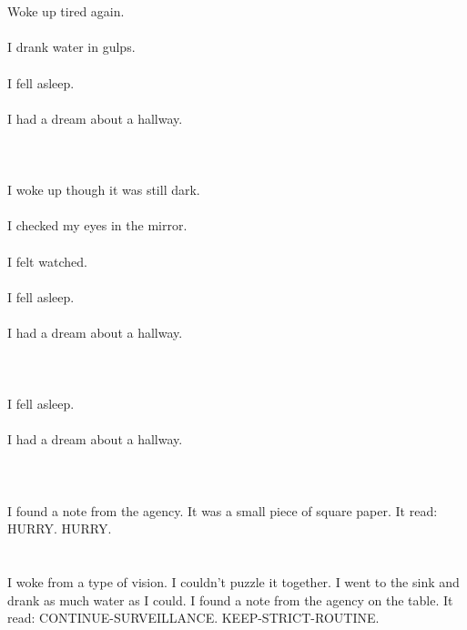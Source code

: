 \documentclass{article}
\begin{document}
    \section{}
    Woke up tired again.\\\\I drank water in gulps.\\\\I fell asleep.\\\\I had a dream about a hallway.\\\\ 
    \newpage
    
    \section{}
    I woke up though it was still dark.\\\\I checked my eyes in the mirror.\\\\I felt watched.\\\\I fell asleep.\\\\I had a dream about a hallway.\\\\ 
    \newpage
    
    \section{}
    I fell asleep.\\\\I had a dream about a hallway.\\\\ 
    \newpage
    
    \section{}
    I found a note from the agency. It was a small piece of square paper. It read: HURRY. HURRY.  
    \newpage
    
    \section{}
    I woke from a type of vision. I couldn't puzzle it together. I went to the sink and drank as much water as I could. I found a note from the agency on the table. It read: CONTINUE-SURVEILLANCE. KEEP-STRICT-ROUTINE.  
    \newpage
    
\end{document}

